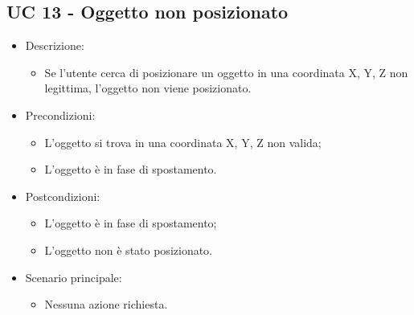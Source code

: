\subsection{UC 13 - Oggetto non posizionato}
\begin{itemize}

	\item Descrizione:
	\begin{itemize}
		\item Se l'utente cerca di posizionare un oggetto in una coordinata X, Y, Z non legittima, l'oggetto non viene posizionato.
	\end{itemize}
	
	\item Precondizioni:
	\begin{itemize}
		\item L'oggetto si trova in una coordinata X, Y, Z non valida;
		\item L'oggetto è in fase di spostamento.
	\end{itemize}
	
	\item Postcondizioni:
	\begin{itemize}
		\item L'oggetto è in fase di spostamento;
		\item L'oggetto non è stato posizionato.
	\end{itemize}
	
	\item Scenario principale:
	\begin{itemize}
		\item Nessuna azione richiesta.
	\end{itemize}
	
\end{itemize}

